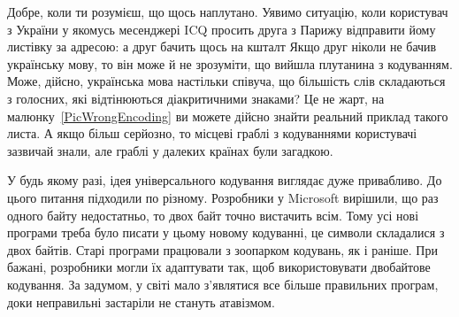 Добре, коли ти розумієш, що щось наплутано.
Уявимо ситуацію, коли користувач з України у якомусь месенджері ICQ просить друга з Парижу відправити йому листівку за адресою:
\noindent а друг бачить щось на кшталт
\noindent Якщо друг ніколи не бачив українську мову, то він може й не зрозуміти, що вийшла плутанина з кодуванням.
Може, дійсно, українська мова настільки співуча, що більшість слів складаються з голосних, які відтінюються діакритичними знаками?
Це не жарт, на малюнку~\ref{PicWrongEncoding} ви можете дійсно знайти реальний приклад такого листа.
А якщо більш серйозно, то місцеві граблі з кодуваннями користувачі зазвичай знали, але граблі у далеких країнах були загадкою.


У будь якому разі, ідея універсального кодування виглядає дуже привабливо.
До цього питання підходили по різному.
Розробники у Microsoft вирішили, що раз одного байту недостатньо, то двох байт точно вистачить всім.
Тому усі нові програми треба було писати у цьому новому кодуванні, це символи складалися з двох байтів.
Старі програми працювали з зоопарком кодувань, як і раніше.
При бажані, розробники могли їх адаптувати так, щоб використовувати двобайтове кодування.
За задумом, у світі мало з'являтися все більше правильних програм, доки неправильні застаріли не стануть атавізмом.

